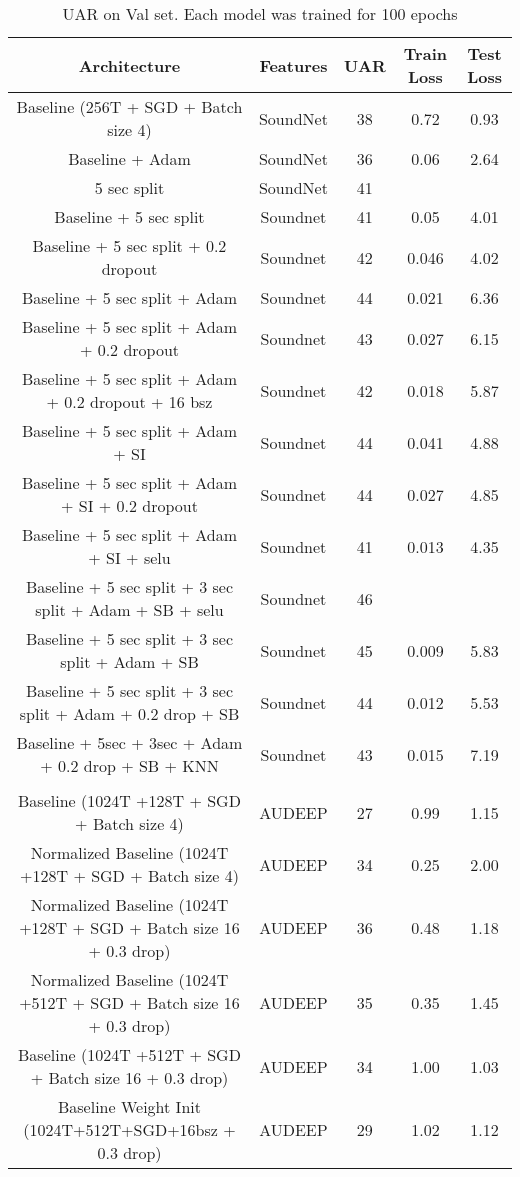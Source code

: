 \iffalse
 \begin{table*}[h]
\centering
\caption{UAR on Val set. Each model was trained for 100 epochs} 
\label{blind}
\begin{tabular}{|c|c|c|c|c|}
  \hline
\textbf{Architecture} & \textbf{Features}  & \textbf{UAR}  & \textbf{Train Loss} & \textbf{Test Loss} \\
  \hline
  
Baseline (256T + SGD + Batch size 4)  & SoundNet  & 38 & 0.72 & 0.93 \\
 \hline
Baseline + Adam  & SoundNet  & 36 & 0.06 & 2.64 \\
 \hline 
5 sec split  & SoundNet  & 41 & & \\
 \hline 
Baseline + 5 sec split & Soundnet & 41  & 0.05 & 4.01 \\ 
\hline
Baseline + 5 sec split + 0.2 dropout & Soundnet & 42  & 0.046 & 4.02 \\ 
\hline
Baseline + 5 sec split + Adam & Soundnet &  44 & 0.021 & 6.36 \\ 
\hline
Baseline + 5 sec split + Adam + 0.2 dropout & Soundnet &  43 & 0.027 & 6.15 \\ 
\hline
Baseline + 5 sec split + Adam + 0.2 dropout + 16 bsz & Soundnet &  42 & 0.018 & 5.87 \\ 
\hline
Baseline + 5 sec split + Adam + SI & Soundnet &  44 & 0.041 & 4.88 \\ 
\hline
Baseline + 5 sec split + Adam + SI + 0.2 dropout & Soundnet &  44 & 0.027 & 4.85 \\ 
\hline
Baseline + 5 sec split + Adam + SI + selu & Soundnet &  41 & 0.013 & 4.35 \\ 
\hline
Baseline + 5 sec split + 3 sec split + Adam + SB + selu & Soundnet &  46 & & \\ 
\hline
Baseline + 5 sec split + 3 sec split + Adam + SB  & Soundnet &  45 & 0.009 & 5.83 \\ 
\hline
Baseline + 5 sec split + 3 sec split + Adam + 0.2 drop +  SB  & Soundnet & 44 & 0.012 & 5.53 \\ 
\hline
Baseline + 5sec + 3sec + Adam + 0.2 drop +  SB + KNN & Soundnet & 43 & 0.015 & 7.19 \\ 
\hline
& & & & \\
\hline
Baseline (1024T +128T + SGD + Batch size 4)  & AUDEEP  & 27 & 0.99 & 1.15 \\
\hline
Normalized Baseline (1024T +128T + SGD + Batch size 4)  & AUDEEP  & 34 & 0.25 & 2.00 \\
\hline
Normalized Baseline (1024T +128T + SGD + Batch size 16 + 0.3 drop)  & AUDEEP  & 36 & 0.48 & 1.18 \\
\hline
Normalized Baseline (1024T +512T + SGD + Batch size 16 + 0.3 drop)  & AUDEEP  & 35 & 0.35 & 1.45 \\
\hline
Baseline (1024T +512T + SGD + Batch size 16 + 0.3 drop)  & AUDEEP  & 34 &1.00  & 1.03 \\
\hline
Baseline Weight Init (1024T+512T+SGD+16bsz + 0.3 drop)  & AUDEEP  & 29 & 1.02 & 1.12 \\
\hline


\end{tabular}
\end{table*}
